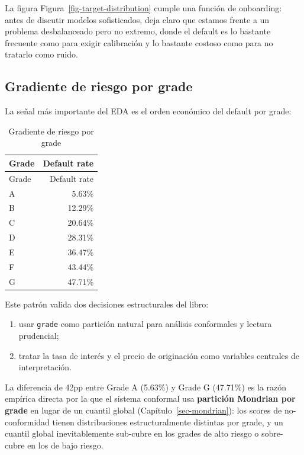 \documentclass[
  spanish,
  11pt,
  letterpaper,
]{scrbook}
\providecommand{\tightlist}{%
  \setlength{\itemsep}{0pt}\setlength{\parskip}{0pt}}
\theoremstyle{plain}
\theoremstyle{remark}
\begin{document}
La figura Figura~\ref{fig-target-distribution} cumple una función de
onboarding: antes de discutir modelos sofisticados, deja claro que
estamos frente a un problema desbalanceado pero no extremo, donde el
default es lo bastante frecuente como para exigir calibración y lo
bastante costoso como para no tratarlo como ruido.

\subsection{Gradiente de riesgo por
grade}\label{gradiente-de-riesgo-por-grade}

La señal más importante del EDA es el orden económico del default por
grade:

\begin{longtable}[]{@{}lr@{}}
\caption{Gradiente de riesgo por
grade}\label{tbl-eda-grade}\tabularnewline
\toprule\noalign{}
Grade & Default rate \\
\midrule\noalign{}
\endfirsthead
\toprule\noalign{}
Grade & Default rate \\
\midrule\noalign{}
\endhead
\bottomrule\noalign{}
\endlastfoot
A & 5.63\% \\
B & 12.29\% \\
C & 20.64\% \\
D & 28.31\% \\
E & 36.47\% \\
F & 43.44\% \\
G & 47.71\% \\
\end{longtable}

Este patrón valida dos decisiones estructurales del libro:

\begin{enumerate}
\def\labelenumi{\arabic{enumi}.}
\tightlist
\item
  usar \texttt{grade} como partición natural para análisis conformales y
  lectura prudencial;
\item
  tratar la tasa de interés y el precio de originación como variables
  centrales de interpretación.
\end{enumerate}

La diferencia de 42pp entre Grade A (5.63\%) y Grade G (47.71\%) es la
razón empírica directa por la que el sistema conformal usa
\textbf{partición Mondrian por grade} en lugar de un cuantil global
(Capítulo~\ref{sec-mondrian}): los scores de no-conformidad tienen
distribuciones estructuralmente distintas por grade, y un cuantil global
inevitablemente sub-cubre en los grades de alto riesgo o sobre-cubre en
los de bajo riesgo.
\end{document}
